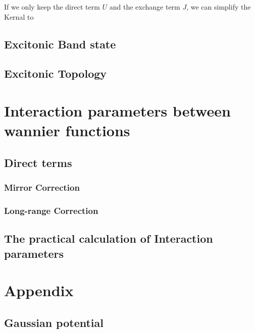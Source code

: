 \documentclass{report}
\begin{document}
If we only keep the direct term $U$ and the exchange term $J$, we can simplify the Kernal to




\section{Excitonic Band state}



\section{Excitonic Topology}

\chapter{Interaction parameters between wannier functions}

\section{Direct terms}

\subsection{Mirror Correction}

\subsection{Long-range Correction}

\section{The practical calculation of Interaction parameters}

\chapter{Appendix}


\section{Gaussian potential}



\nocite{*} %
\end{document}
